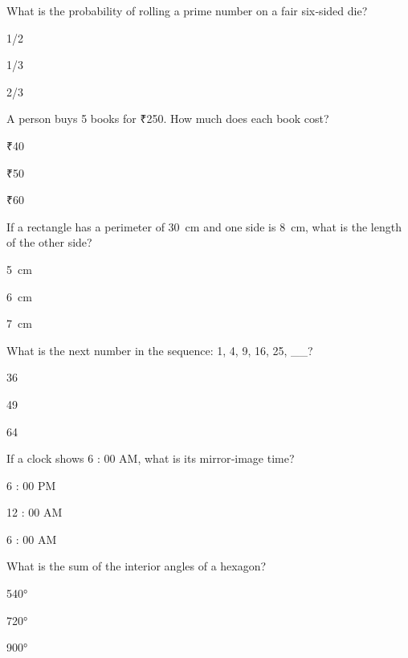 \begin{enhancedmcq}{What is the probability of rolling a prime number on a fair six‑sided die?}
\item 1/2
\item 1/3
\item 2/3

\end{enhancedmcq}
\begin{enhancedmcq}{A person buys 5 books for ₹250. How much does each book cost?}
\item ₹40
\item ₹50
\item ₹60

\end{enhancedmcq}
\begin{enhancedmcq}{If a rectangle has a perimeter of 30 cm and one side is 8 cm, what is the length of the other side?}
\item 5 cm
\item 6 cm
\item 7 cm

\end{enhancedmcq}
\begin{enhancedmcq}{What is the next number in the sequence: 1, 4, 9, 16, 25, __?}
\item 36
\item 49
\item 64

\end{enhancedmcq}
\begin{enhancedmcq}{If a clock shows 6 : 00 AM, what is its mirror‑image time?}
\item 6 : 00 PM
\item 12 : 00 AM
\item 6 : 00 AM

\end{enhancedmcq}
\begin{enhancedmcq}{What is the sum of the interior angles of a hexagon?}
\item 540°
\item 720°
\item 900°

\end{enhancedmcq}
